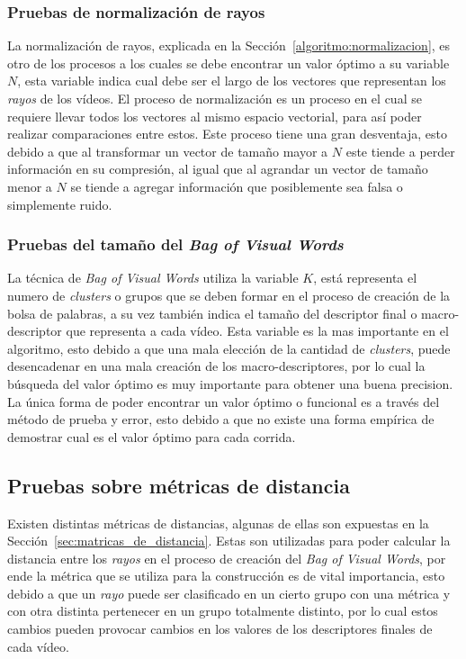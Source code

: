 	\subsubsection{Pruebas de normalización de rayos}	
	
	La normalización de rayos, explicada en la Sección~\ref{algoritmo:normalizacion}, es otro de los procesos a los cuales se debe encontrar un valor óptimo a su variable $N$, esta variable indica cual debe ser el largo de los vectores que representan los \textit{rayos} de los vídeos. El proceso de normalización es un proceso en el cual se requiere llevar todos los vectores al mismo espacio vectorial, para así poder realizar comparaciones entre estos. Este proceso tiene una gran desventaja, esto debido a que al transformar un vector de tamaño mayor a $N$ este tiende a perder información en su compresión, al igual que al agrandar un vector de tamaño menor a $N$ se tiende a agregar información que posiblemente sea falsa o simplemente ruido.

	\subsubsection{Pruebas del tamaño del \textit{Bag of Visual Words}}
	La técnica de \textit{Bag of Visual Words} utiliza la variable $K$, está representa el numero de \textit{clusters} o grupos que se deben formar en el proceso de creación de la bolsa de palabras, a su vez también indica el tamaño del descriptor final o macro-descriptor que representa a cada vídeo. Esta variable es la  mas importante en el algoritmo, esto debido a que una mala elección de la cantidad de \textit{clusters}, puede desencadenar en una mala creación de los macro-descriptores, por lo cual la búsqueda del valor óptimo es muy importante para obtener una buena precision. La única forma de poder encontrar un valor óptimo o funcional es a través del método de prueba y error, esto debido a que no existe una forma empírica de demostrar cual es el valor óptimo para cada corrida.


\subsection{Pruebas sobre métricas de distancia}
\label{exp:metricas}
Existen distintas métricas de distancias, algunas de ellas son expuestas en la Sección~\ref{sec:matricas_de_distancia}. Estas son utilizadas para poder calcular la distancia entre los \textit{rayos} en el proceso de creación del \textit{Bag of Visual Words}, por ende la métrica que se utiliza para la construcción es de vital importancia, esto debido a que un \textit{rayo} puede ser clasificado en un cierto grupo con una métrica y con otra distinta pertenecer en un grupo totalmente distinto, por lo cual estos cambios pueden provocar cambios en los valores de los descriptores finales de cada vídeo.
